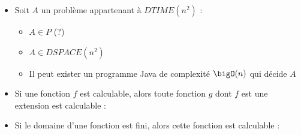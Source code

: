 \begin{itemize}
\item Soit $A$ un problème appartenant à $DTIME(n^2)$ : %
	\begin{itemize}
	\item $A \in P$ (?)
	\item $A \in DSPACE (n^2)$
	\item Il peut exister un programme Java de complexité $\bigO(n)$ qui décide $A$
	\end{itemize}
\item Si une fonction $f$ est calculable, alors toute fonction $g$ dont $f$ est une extension est calculable :  %
\item Si le domaine d’une fonction est fini, alors cette fonction est calculable :  %
\end{itemize}